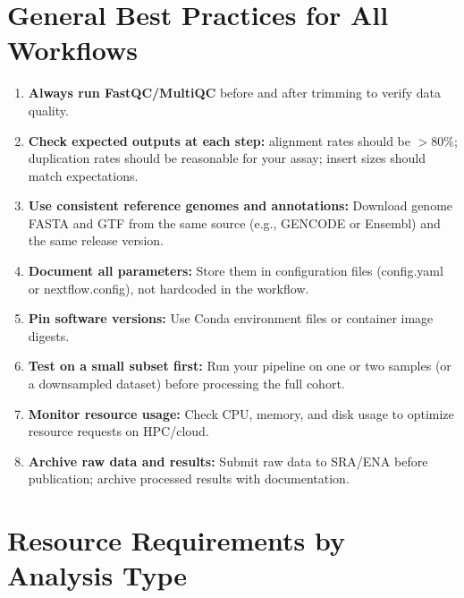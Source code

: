 \section{General Best Practices for All Workflows}
\label{sec:wf:bestpractices}

\begin{protocolbox}[title={Workflow Best Practices Checklist}]
\begin{enumerate}[itemsep=3pt]
  \item \textbf{Always run FastQC/MultiQC} before and after trimming to verify data quality.
  \item \textbf{Check expected outputs at each step:} alignment rates should be $>$80\%; duplication rates should be reasonable for your assay; insert sizes should match expectations.
  \item \textbf{Use consistent reference genomes and annotations:} Download genome FASTA and GTF from the same source (e.g., GENCODE or Ensembl) and the same release version.
  \item \textbf{Document all parameters:} Store them in configuration files (config.yaml or nextflow.config), not hardcoded in the workflow.
  \item \textbf{Pin software versions:} Use Conda environment files or container image digests.
  \item \textbf{Test on a small subset first:} Run your pipeline on one or two samples (or a downsampled dataset) before processing the full cohort.
  \item \textbf{Monitor resource usage:} Check CPU, memory, and disk usage to optimize resource requests on HPC/cloud.
  \item \textbf{Archive raw data and results:} Submit raw data to SRA/ENA before publication; archive processed results with documentation.
\end{enumerate}
\end{protocolbox}

\section{Resource Requirements by Analysis Type}
\label{sec:wf:resources}

